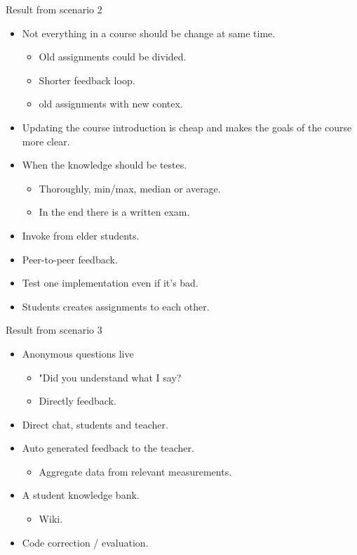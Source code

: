 \documentclass[a4paper,12pt]{article}
\begin{document}
Result from scenario 2
\begin{itemize}
\item Not everything in a course should be change at same time.
\begin{itemize}
\item Old assignments could be divided.
\item Shorter feedback loop.
\item old assignments with new contex.
\end{itemize}
\item Updating the course introduction is cheap and makes the goals of the course more clear.
\item When the knowledge should be testes.
\begin{itemize}
\item Thoroughly, min/max, median or average.
\item In the end there is a written exam.
\end{itemize}
\item Invoke from elder students.
\item Peer-to-peer feedback.
\item Test one implementation even if it's bad.
\item Students creates assignments to each other.
\end{itemize}

Result from scenario 3
\begin{itemize}
\item Anonymous questions live
\begin{itemize}
\item "Did you understand what I say?
\item Directly feedback.
\end{itemize}
\item Direct chat, students and teacher.
\item Auto generated feedback to the teacher.
\begin{itemize}
\item Aggregate data from relevant measurements.
\end{itemize}
\item A student knowledge bank.
\begin{itemize}
\item Wiki.
\end{itemize}
\item Code correction / evaluation.
\end{itemize}
\end{document}
